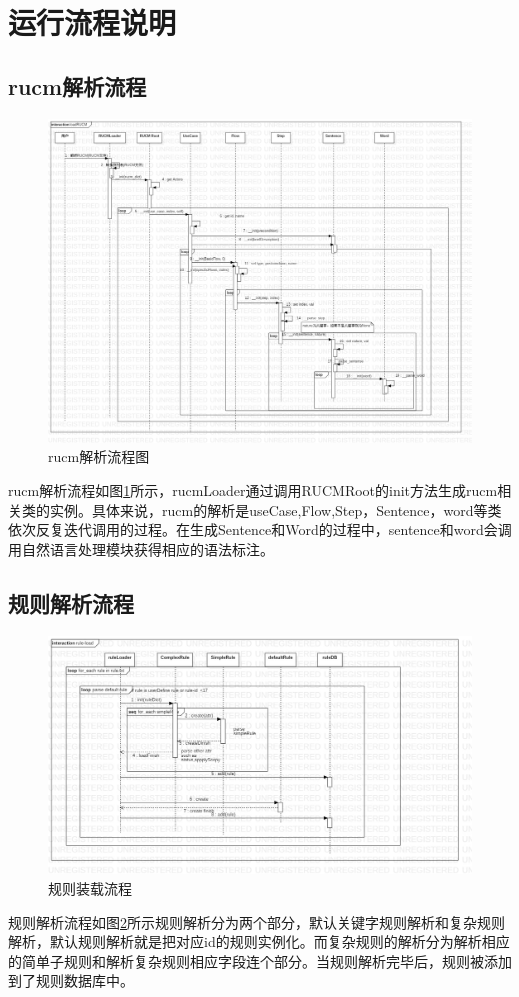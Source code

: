 \section{运行流程说明}
\subsection{rucm解析流程}
   	\begin{figure}
	\centering
	\includegraphics[width=1\textwidth]{src/sequence_loadRUCM.jpg} 
	\caption{rucm解析流程图} 
	\label{sequence_loadRUCM}
	\end{figure}
	rucm解析流程如图\ref{sequence_loadRUCM}所示，rucmLoader通过调用RUCMRoot的init方法生成rucm相关类的实例。具体来说，rucm的解析是useCase,Flow,Step，Sentence，word等类依次反复迭代调用的过程。在生成Sentence和Word的过程中，sentence和word会调用自然语言处理模块获得相应的语法标注。

\subsection{规则解析流程}
   	\begin{figure}
	\centering
	\includegraphics[width=1\textwidth]{src/sequence_ruleLoad.jpg} 
	\caption{规则装载流程}
	\label{sequence_ruleLoad}
\end{figure}
	规则解析流程如图\ref{sequence_ruleLoad}所示规则解析分为两个部分，默认关键字规则解析和复杂规则解析，默认规则解析就是把对应id的规则实例化。而复杂规则的解析分为解析相应的简单子规则和解析复杂规则相应字段连个部分。当规则解析完毕后，规则被添加到了规则数据库中。
